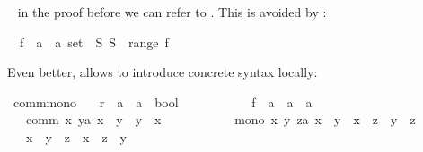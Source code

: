 \begin{isabellebody}
\begin{isamarkuptext}
~ in the proof before we can refer to .
This is avoided by :%
\end{isamarkuptext}%
\isamarkuptrue%
\isamarkupfalse%
\ \ f\ {\isacharcolon}{\isacharcolon}\ {\isachardoublequoteopen}{\isacharprime}a\ {\isasymRightarrow}\ {\isacharprime}a\ set{\isachardoublequoteclose}\ \ {\isachardoublequoteopen}{\isasymexists}S{\isachardot}\ S\ {\isasymnotin}\ range\ f{\isachardoublequoteclose}%
\isadelimproof
%
\endisadelimproof
%
\isatagproof
%
\endisatagproof
{\isafoldproof}%
%
\isadelimproof
%
\endisadelimproof
%
\begin{isamarkuptext}%
\noindent
Even better,  allows to introduce concrete syntax locally:%
\end{isamarkuptext}%
\isamarkuptrue%
\isamarkupfalse%
\ comm{\isacharunderscore}mono{\isacharcolon}\isanewline
\ \ \ r\ {\isacharcolon}{\isacharcolon}\ {\isachardoublequoteopen}{\isacharprime}a\ {\isasymRightarrow}\ {\isacharprime}a\ {\isasymRightarrow}\ bool{\isachardoublequoteclose}\ {\isacharparenleft}\ {\isachardoublequoteopen}{\isachargreater}{\isachardoublequoteclose}\ {}{}{\isacharparenright}\ \isanewline
\ \ \ \ \ \ \ f\ {\isacharcolon}{\isacharcolon}\ {\isachardoublequoteopen}{\isacharprime}a\ {\isasymRightarrow}\ {\isacharprime}a\ {\isasymRightarrow}\ {\isacharprime}a{\isachardoublequoteclose}\ \ \ {\isacharparenleft}\ {\isachardoublequoteopen}{\isacharplus}{\isacharplus}{\isachardoublequoteclose}\ {}{}{\isacharparenright}\isanewline
\ \ \ comm{\isacharcolon}\ {\isachardoublequoteopen}{\isasymAnd}x\ y{\isacharcolon}{\isacharcolon}{\isacharprime}a{\isachardot}\ x\ {\isacharplus}{\isacharplus}\ y\ {\isacharequal}\ y\ {\isacharplus}{\isacharplus}\ x{\isachardoublequoteclose}\ \isanewline
\ \ \ \ \ \ \ \ \ \ mono{\isacharcolon}\ {\isachardoublequoteopen}{\isasymAnd}x\ y\ z{\isacharcolon}{\isacharcolon}{\isacharprime}a{\isachardot}\ x\ {\isachargreater}\ y\ {\isasymLongrightarrow}\ x\ {\isacharplus}{\isacharplus}\ z\ {\isachargreater}\ y\ {\isacharplus}{\isacharplus}\ z{\isachardoublequoteclose}\isanewline
\ \ \ {\isachardoublequoteopen}x\ {\isachargreater}\ y\ {\isasymLongrightarrow}\ z\ {\isacharplus}{\isacharplus}\ x\ {\isachargreater}\ z\ {\isacharplus}{\isacharplus}\ y{\isachardoublequoteclose}\isanewline
%
\isadelimproof
%
\endisadelimproof

\end{isabellebody}
